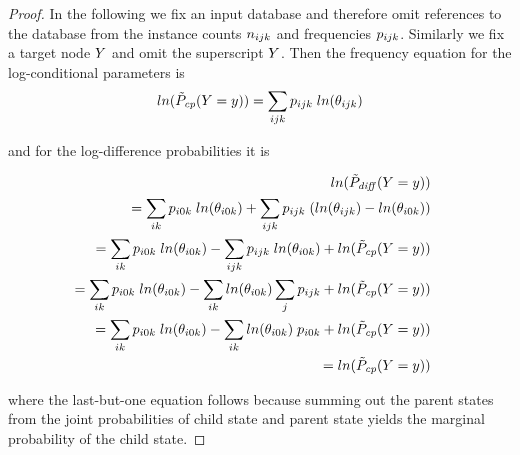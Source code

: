 \documentclass[twoside,leqno,twocolumn]{article}
\begin{document}
\begin{proof} In the following we fix an input database and therefore omit references to the database from the instance counts $n_{ijk}$ and frequencies $p_{ijk}$. Similarly we fix a target node $Y$ and omit the superscript $Y$. Then the frequency equation for the log-conditional parameters is
$$ln(\tilde{P}_{\it{cp}}(Y = y)) = \sum_{ijk} p_{ijk} \; ln(\theta_{ijk})$$

and for the log-difference probabilities it is 
%
\begin{small}
\begin{eqnarray*}
ln(\tilde{P}_{\it{diff}}(Y = y)) & & \\
= \sum_{ik} p_{i0k} \; ln(\theta_{i0k}) + \sum_{ijk} p_{ijk} \; (ln(\theta_{ijk}) - ln(\theta_{i0k})) && \\
=\sum_{ik} p_{i0k} \; ln(\theta_{i0k}) - \sum_{ijk} p_{ijk} \; ln(\theta_{i0k}) + ln(\tilde{P}_{\it{cp}}(Y = y)) && \\
=\sum_{ik} p_{i0k} \; ln(\theta_{i0k}) - \sum_{ik} ln(\theta_{i0k}) \sum_{j} p_{ijk} + ln(\tilde{P}_{\it{cp}}(Y = y)) && \\
=\sum_{ik} p_{i0k} \; ln(\theta_{i0k}) - \sum_{ik} ln(\theta_{i0k}) \; p_{i0k} + ln(\tilde{P}_{\it{cp}}(Y = y)) && \\
=ln(\tilde{P}_{\it{cp}}(Y = y))&&
\end{eqnarray*}
\end{small}
where the last-but-one equation follows 
%
%
%
because summing out the parent states from the joint probabilities of child state and parent state yields the marginal probability of the child state. \end{proof}
%
\end{document}
